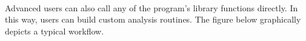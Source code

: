 \documentclass{article}
\begin{document}
\paragraph{}
Advanced users can also call any of the program's library functions
directly.  In this way, users can build custom analysis routines.  The
figure below graphically depicts a typical workflow.
\newline
\newline
{}
\newline
\newline
\newpage
\printbibliography
\end{document}
